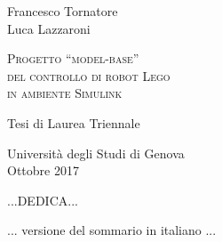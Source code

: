 \documentclass[a4paper,11pt,twoside,openright]{book}
\newenvironment{abstract}
{\cleardoublepage
	\thispagestyle{empty}
	\null \vfill\begin{center}
		\bfseries \abstractname \end{center}}
{\vfill\null}
\begin{document}
\thispagestyle{empty}
\begin{center}
	Francesco Tornatore\\
	Luca Lazzaroni
\end{center}

\null{}

\begin{center}
	\begin{Huge}
		\textsc{Progetto ``model-base''\\
			 del controllo di robot Lego\\
			 in ambiente Simulink\\}
	\end{Huge}
\end{center}
\begin{center}
	Tesi di Laurea Triennale
\end{center}

\null
\null
\vfill
\begin{center}
	Università degli Studi di Genova\\
	Ottobre 2017
\end{center}
\clearpage


\begin{flushright}
	\null{}
	...DEDICA...
	\null
\end{flushright}

\begin{abstract}
	\begin{center}
		... versione del sommario in italiano ...
	\end{center}
\end{abstract}

\tableofcontents




\end{document}
